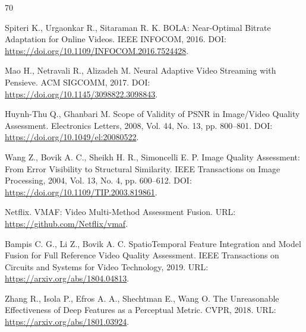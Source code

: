 \documentclass[12pt,a4paper,oneside,openany]{report}
\begin{document}
\clearpage


{}

\begin{thebibliography}{70}


  Spiteri K., Urgaonkar R., Sitaraman R. K. BOLA: Near-Optimal Bitrate Adaptation for Online
  Videos. IEEE INFOCOM, 2016. DOI: \url{https://doi.org/10.1109/INFOCOM.2016.7524428}.

  Mao H., Netravali R., Alizadeh M. Neural Adaptive Video Streaming with Pensieve. ACM SIGCOMM,
  2017. DOI: \url{https://doi.org/10.1145/3098822.3098843}.


  Huynh-Thu Q., Ghanbari M. Scope of Validity of PSNR in Image/Video Quality Assessment.
  Electronics Letters, 2008, Vol. 44, No. 13, pp. 800--801. DOI:
  \url{https://doi.org/10.1049/el:20080522}.

  Wang Z., Bovik A. C., Sheikh H. R., Simoncelli E. P. Image Quality Assessment: From Error
  Visibility to Structural Similarity. IEEE Transactions on Image Processing, 2004, Vol. 13, No.
  4, pp. 600--612. DOI: \url{https://doi.org/10.1109/TIP.2003.819861}.

  Netflix. VMAF: Video Multi-Method Assessment Fusion. URL: \url{https://github.com/Netflix/vmaf}.

  Bampis C. G., Li Z., Bovik A. C. SpatioTemporal Feature Integration and Model Fusion for Full
  Reference Video Quality Assessment. IEEE Transactions on Circuits and Systems for Video
  Technology, 2019. URL: \url{https://arxiv.org/abs/1804.04813}.

  Zhang R., Isola P., Efros A. A., Shechtman E., Wang O. The Unreasonable Effectiveness of Deep
  Features as a Perceptual Metric. CVPR, 2018. URL: \url{https://arxiv.org/abs/1801.03924}.


\end{thebibliography}
\end{document}
